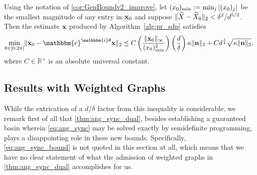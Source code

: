 
\begin{corollary}
Using the notation of \cref{cor:GenBoundv2_improve}, let $(x_0)_{\rm min} := \min_j |(x_0)_j|$ be the smallest magnitude of any entry in $\mathbf{x}_0$ and suppose $\lVert\widetilde{X} - \widetilde{X}_0\rVert_2 < \delta^2 / d^{5/2}$.  Then the estimate $\mathbf{x}$ produced by Algorithm~\ref{alg:pr_sdp} satisfies 
\begin{equation} \min_{\theta \in [0, 2 \pi]} \norm{\x_0 - \mathbbm{e}^{\mathbbm{i} \theta} \x}_2 \leq C \left( \frac{\norm{\x_0}_{\infty}}{(x_0)^2_{\rm min}} \right) \left( \frac{d}{\delta} \right) \kappa \| \n \|_2 + C d^{\frac{1}{4}} \sqrt{\kappa \| \n \|_2 }, \label{eq:main_improve} \end{equation}
where $C \in \mathbb{R}^+$ is an absolute universal constant.  
\label{cor:main_improve}
\end{corollary}

\subsection{Results with Weighted Graphs}
While the extrication of a $d / \delta$ factor from this inequality is considerable, we remark first of all that \cref{thm:ang_sync_dual}, besides establishing a guaranteed basin wherein \eqref{eq:ang_sync} may be solved exactly by semidefinite programming, plays a disappointing role in these new bounds.  Specifically, \eqref{eq:ang_sync_bound} is not quoted in this section at all, which means that we have no clear statement of what the admission of weighted graphs in \cref{thm:ang_sync_dual} accomplishes for us.

